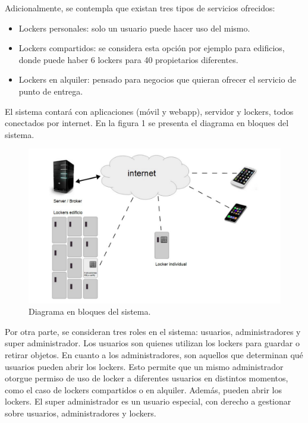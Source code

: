 \documentclass[
11pt, %
]{charter}
\begin{document}
Adicionalmente, se contempla que existan tres tipos de servicios ofrecidos:
\begin{itemize}
	\item Lockers personales: solo un usuario puede hacer uso del mismo.
	\item Lockers compartidos: se considera esta opción por ejemplo para edificios, donde puede haber 6 lockers para 40 propietarios diferentes.
	\item Lockers en alquiler: pensado para negocios que quieran ofrecer el servicio de punto de entrega.
\end{itemize}

El sistema contará con aplicaciones (móvil y webapp), servidor y lockers, todos conectados por internet.
En la figura 1 se presenta el diagrama en bloques del sistema.

\begin{figure}[htpb]
\centering 
\includegraphics[width=1\textwidth]{./Figuras/diagrama.png}
\caption{Diagrama en bloques del sistema.}
\label{fig:diagBloques}
\end{figure}

\vspace{55px}

Por otra parte, se consideran tres roles en el sistema: usuarios, administradores y super administrador.
Los usuarios son quienes utilizan los lockers para guardar o retirar objetos.
En cuanto a los administradores, son aquellos que determinan qué usuarios pueden abrir los lockers. Esto permite que un mismo administrador otorgue permiso de uso de locker a diferentes usuarios en distintos momentos, como el caso de lockers compartidos o en alquiler. Además, pueden abrir los lockers.
El super administrador es un usuario especial, con derecho a gestionar sobre usuarios, administradores y lockers.
\end{document}
